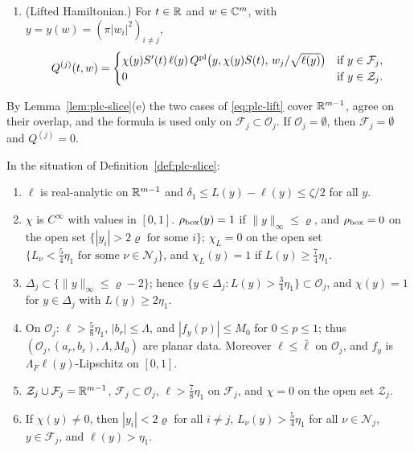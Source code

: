 \begin{definition}
\begin{enumerate}[label=(\arabic*)]
\begin{align*}
 \end{align*}
\item (Lifted Hamiltonian.) For $t\in\mathbb{R}$ and $w\in\mathbb{C}^m$, with $y=y(w)=(\pi|w_i|^2)_{i\ne j}$,
 \begin{equation}\label{eq:plc-lift}
  Q^{(j)}(t,w)=\begin{cases}\chi(y)S'(t)\,\ell(y)\,Q^{\rm pl}\bigl(y,\chi(y)S(t),\,w_j/\sqrt{\ell(y)}\bigr)&\text{if }y\in\mathcal F_j,\\
  0&\text{if }y\in\mathcal Z_j.\end{cases}
 \end{equation}
\end{enumerate}
\end{definition}

By Lemma~\ref{lem:plc-slice}(e) the two cases of \eqref{eq:plc-lift} cover $\mathbb{R}^{m-1}$, agree on their overlap, and the
formula is used only on $\mathcal F_j\subset\mathcal O_j$. If $\mathcal O_j=\emptyset$, then $\mathcal F_j=\emptyset$ and $Q^{(j)}=0$.

\begin{lemma}\label{lem:plc-slice}
In the situation of Definition~\ref{def:plc-slice}:
\begin{enumerate}[label=(\alph*)]
\item $\ell$ is real-analytic on $\mathbb{R}^{m-1}$ and $\delta_1\le L(y)-\ell(y)\le\zeta/2$ for all $y$.
\item $\chi$ is $C^\infty$ with values in $[0,1]$. $\rho_{\rm box}(y)=1$ if $\|y\|_\infty\le\varrho$, and $\rho_{\rm box}=0$ on the open set
 $\{|y_i|>2\varrho\text{ for some }i\}$; $\chi_L=0$ on the open set $\{L_\nu<\frac54\eta_1\text{ for some }\nu\in\mathcal N_j\}$, and
 $\chi_L(y)=1$ if $L(y)\ge\frac74\eta_1$.
\item $\Delta_j\subset\{\|y\|_\infty\le\varrho-2\}$; hence $\{y\in\Delta_j:L(y)>\frac34\eta_1\}\subset\mathcal O_j$, and $\chi(y)=1$ for
 $y\in\Delta_j$ with $L(y)\ge2\eta_1$.
\item On $\mathcal O_j$: $\ell>\frac58\eta_1$, $|b_r|\le\Lambda$, and $|f_y(p)|\le M_0$ for $0\le p\le1$; thus
 $(\mathcal O_j,(a_r,b_r),\Lambda,M_0)$ are planar data. Moreover $\ell\le\bar\ell$ on $\mathcal O_j$, and $f_y$ is $\Lambda_F\ell(y)$-Lipschitz on $[0,1]$.
\item $\mathcal Z_j\cup\mathcal F_j=\mathbb{R}^{m-1}$, $\mathcal F_j\subset\mathcal O_j$, $\ell>\frac78\eta_1$ on $\mathcal F_j$, and $\chi=0$ on the open
 set $\mathcal Z_j$.
\item If $\chi(y)\ne0$, then $|y_i|<2\varrho$ for all $i\ne j$, $L_\nu(y)>\frac54\eta_1$ for all $\nu\in\mathcal N_j$, $y\in\mathcal F_j$,
 and $\ell(y)>\eta_1$.
\end{enumerate}
\end{lemma}

